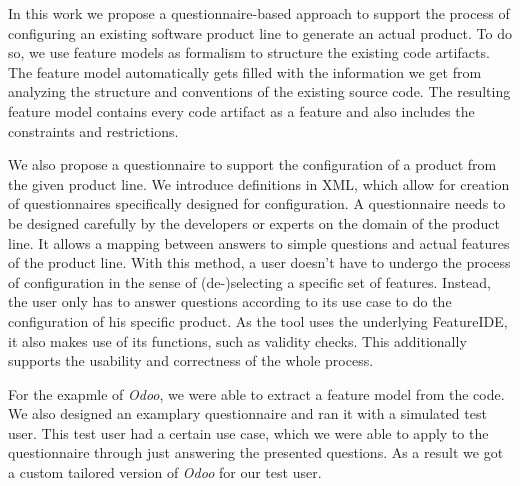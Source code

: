 
In this work we propose a questionnaire-based approach to support the process of configuring an existing software product line to generate an actual product. To do so, we use feature models as formalism to structure the existing code artifacts. The feature model automatically gets filled with the information we get from analyzing the structure and conventions of the existing source code. The resulting feature model contains every code artifact as a feature and also includes the constraints and restrictions.

We also propose a questionnaire to support the configuration of a product from the given product line. We introduce definitions in XML, which allow for creation of questionnaires specifically designed for configuration. A questionnaire needs to be designed carefully by the developers or experts on the domain of the product line. It allows a mapping between answers to simple questions and actual features of the product line. With this method, a user doesn't have to undergo the process of configuration in the sense of \mbox{(de-)selecting} a specific set of features. Instead, the user only has to answer questions according to its use case to do the configuration of his specific product. As the tool uses the underlying FeatureIDE, it also makes use of its functions, such as validity checks. This additionally supports the usability and correctness of the whole process.

For the exapmle of \textit{Odoo}, we were able to extract a feature model from the code. We also designed an examplary questionnaire and ran it with a simulated test user. This test user had a certain use case, which we were able to apply to the questionnaire through just answering the presented questions. As a result we got a custom tailored version of \textit{Odoo} for our test user.